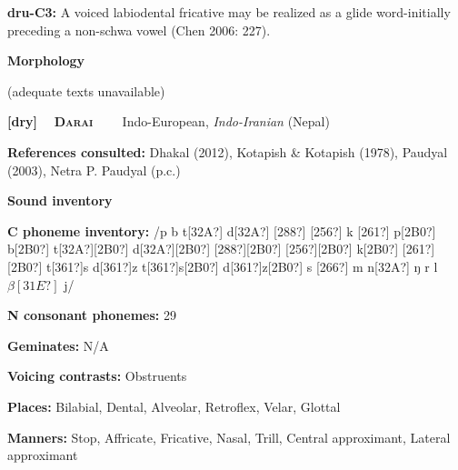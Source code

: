 \begin{styleBody}
\textbf{dru-C3: }A voiced labiodental fricative may be realized as a glide word-initially preceding a non-schwa vowel (Chen 2006: 227).
\end{styleBody}

\begin{styleBody}
\textbf{Morphology}
\end{styleBody}

\begin{styleBody}
(adequate texts unavailable)
\end{styleBody}

\clearpage\begin{styleBody}
\textbf{[dry] }\ \ \textbf{\textsc{Darai}}\textbf{\ \ \ \ }Indo-European, \textit{Indo-Iranian} (Nepal)
\end{styleBody}

\begin{styleBody}
\textbf{References consulted: }Dhakal (2012), Kotapish \& Kotapish (1978), Paudyal (2003), Netra P. Paudyal (p.c.)
\end{styleBody}

\begin{styleBody}
\textbf{Sound inventory}
\end{styleBody}

\begin{styleBody}
\textbf{C phoneme inventory:} /p b t[32A?] d[32A?] [288?] [256?] k [261?] p[2B0?] b[2B0?] t[32A?][2B0?] d[32A?][2B0?] [288?][2B0?] [256?][2B0?] k[2B0?] [261?][2B0?] t[361?]s d[361?]z t[361?]s[2B0?] d[361?]z[2B0?] s [266?] m n[32A?] ŋ r l $\beta [31E?]$ j/
\end{styleBody}

\begin{styleBody}
\textbf{N consonant phonemes:} 29
\end{styleBody}

\begin{styleBody}
\textbf{Geminates:} N/A
\end{styleBody}

\begin{styleBody}
\textbf{Voicing contrasts:} Obstruents
\end{styleBody}

\begin{styleBody}
\textbf{Places:} Bilabial, Dental, Alveolar, Retroflex, Velar, Glottal
\end{styleBody}

\begin{styleBody}
\textbf{Manners:} Stop, Affricate, Fricative, Nasal, Trill, Central approximant, Lateral approximant
\end{styleBody}

